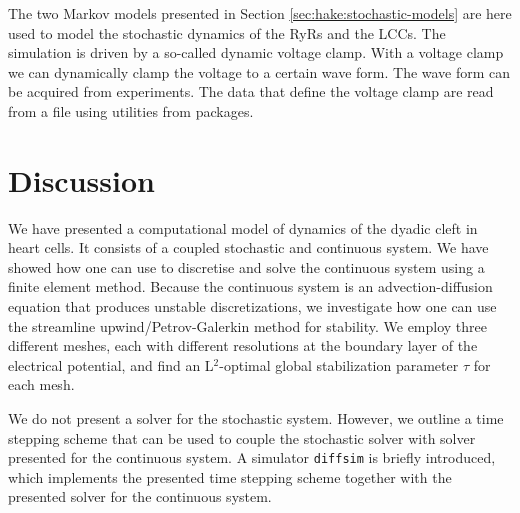 The two Markov models presented in Section
\ref{sec:hake:stochastic-models} are here used to model the stochastic
dynamics of the RyRs and the LCCs. The simulation is driven by a
so-called dynamic voltage clamp. With a voltage clamp we can
dynamically clamp the voltage to a certain wave form. The wave form
can be acquired from experiments. The data that define the voltage
clamp are read from a file using utilities from \numpy
{} packages.

\section{Discussion}

We have presented a computational model of \Ca dynamics of the dyadic
cleft in heart cells. It consists of a coupled stochastic and
continuous system. We have showed how one can use \pydolfin to
discretise and solve the continuous system using a finite element
method. Because the continuous system is an advection-diffusion
equation that produces unstable discretizations, we investigate how
one can use the streamline upwind/Petrov-Galerkin method for
stability. We employ three different meshes, each with different
resolutions at the boundary layer of the electrical potential, and
find an L$^2$-optimal global stabilization parameter $\tau$ for each
mesh.

We do not present a solver for the stochastic system. However, we
outline a time stepping scheme that can be used to couple the
stochastic solver with solver presented for the continuous system. A
simulator \texttt{diffsim} is briefly introduced, which implements the
presented time stepping scheme together with the presented solver for
the continuous system.
